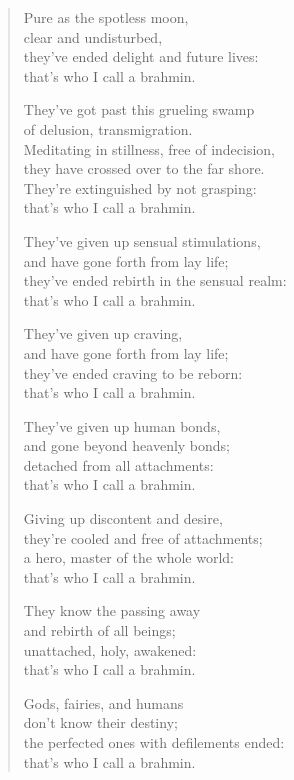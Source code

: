 \documentclass[12pt,openany]{book}%
\begin{document}
\begin{verse}
Pure as the spotless moon, \\
clear and undisturbed, \\
they’ve ended delight and future lives: \\
that’s who I call a brahmin. 

They’ve got past this grueling swamp \\
of delusion, transmigration. \\
Meditating in stillness, free of indecision, \\
they have crossed over to the far shore. \\
They’re extinguished by not grasping: \\
that’s who I call a brahmin. 

They’ve given up sensual stimulations, \\
and have gone forth from lay life; \\
they’ve ended rebirth in the sensual realm: \\
that’s who I call a brahmin. 

They’ve given up craving, \\
and have gone forth from lay life; \\
they’ve ended craving to be reborn: \\
that’s who I call a brahmin. 

They’ve given up human bonds, \\
and gone beyond heavenly bonds; \\
detached from all attachments: \\
that’s who I call a brahmin. 

Giving up discontent and desire, \\
they’re cooled and free of attachments; \\
a hero, master of the whole world: \\
that’s who I call a brahmin. 

They know the passing away \\
and rebirth of all beings; \\
unattached, holy, awakened: \\
that’s who I call a brahmin. 

Gods, fairies, and humans \\
don’t know their destiny; \\
the perfected ones with defilements ended: \\
that’s who I call a brahmin. 


\end{verse}
\end{document}
